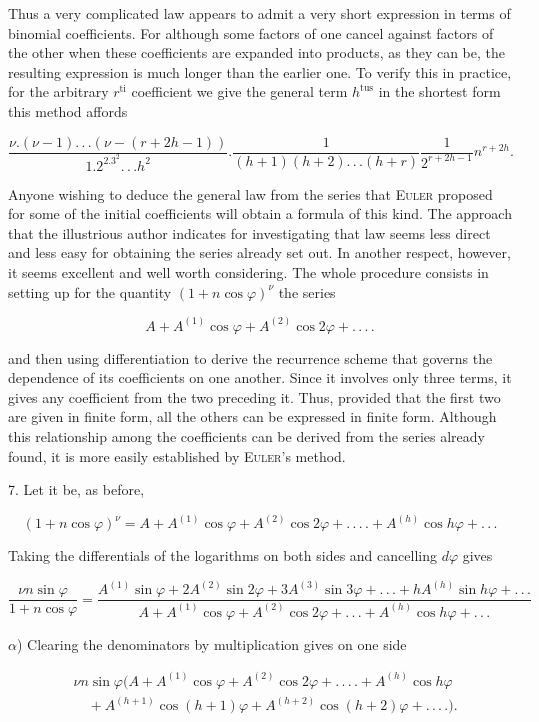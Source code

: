 \par\noindent{}%
\hspace*{\parindent}Thus a very complicated law appears to admit a very short expression in terms of binomial coefficients.
For although some factors of one cancel against factors of the other when these coefficients are expanded into products, as they can be, the resulting expression is much longer than the earlier one. To verify this in practice, for the arbitrary $r^{\text{ti}}$ coefficient we give the general term $h^{\text{tus}}$ in the shortest form this method affords

\[
\frac{\nu.(\nu-1).\,.\,.(\nu-(r+2h-1))}{1.2^2.3^2.\,.\,. h^2} . \frac{1}{(h+1)(h+2).\,.\,.(h+r)}\frac{1}{2^{r+2h-1}}n^{r+2h}.
\]

Anyone wishing to deduce the general law from the series that \textsc{Euler} proposed for some of the initial coefficients will obtain a formula of this kind. The approach that the illustrious author indicates for investigating that law seems less direct and less easy for obtaining the series already set out. In another respect, however, it seems excellent and well worth considering.
The whole procedure consists in setting up for the quantity $(1+n\cos\varphi)^{\nu}$ the series

\[
A+A^{(1)}\cos\varphi+A^{(2)}\cos2\varphi+.\,.\,.\,.
\]

\noindent and then using differentiation to derive the recurrence scheme that governs the dependence of its coefficients on one another. Since it involves only three terms, it gives any coefficient from the two preceding it. Thus, provided that the first two are given in finite form, all the others can be expressed in finite form. Although this relationship among the coefficients can be derived from the series already found, it is more easily established by \textsc{Euler}'s method.

7. Let it be, as before,

\[
(1+n\cos\varphi)^{\nu}=A+A^{(1)}\cos\varphi+A^{(2)}\cos2\varphi+.\,.\,.\,.+A^{(h)}\cos h\varphi+.\,.\,.
\]

\noindent Taking the differentials of the logarithms on both sides and cancelling $d\varphi$ gives

\[
\frac{\nu n\sin\varphi}{1+n\cos\varphi}=\frac{A^{(1)}\sin\varphi+2A^{(2)}\sin2\varphi+3A^{(3)}\sin3\varphi+.\,.\,.+hA^{(h)}\sin h\varphi+.\,.\,.}{A+A^{(1)}\cos\varphi+A^{(2)}\cos2\varphi+.\,.\,.+A^{(h)}\cos h\varphi+.\,.\,.}
\]

$\alpha$) Clearing the denominators by multiplication gives on one side

\[
\begin{aligned}
&\nu n\sin\varphi\bigl(A+A^{(1)}\cos\varphi+A^{(2)}\cos2\varphi+.\,.\,.\,.+A^{(h)}\cos h\varphi\\&\quad+A^{(h+1)}\cos(h+1)\varphi+A^{(h+2)}\cos(h+2)\varphi+.\,.\,.\,.\bigr).
\end{aligned}
\]
